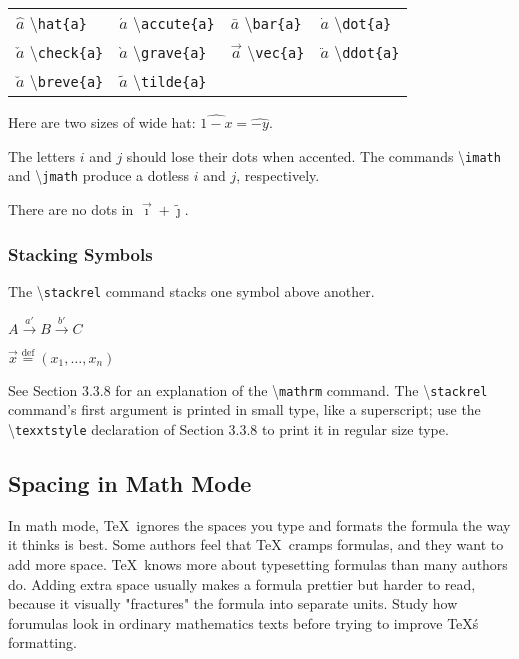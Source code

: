 \documentclass[twocolumn]{book}        %
\begin{document}
\begin{tabular}{l l l l}
        $\hat{a}$ \textbackslash \texttt{hat\{a\}}          &   
        $\acute{a}$ \textbackslash \texttt{accute\{a\}}     &
        $\bar{a}$ \textbackslash \texttt{bar\{a\}}          &
        $\dot{a}$ \textbackslash \texttt{dot\{a\}}          \\

        $\check{a}$ \textbackslash \texttt{check\{a\}}      &   
        $\grave{a}$ \textbackslash \texttt{grave\{a\}}      &
        $\vec{a}$ \textbackslash \texttt{vec\{a\}}          &
        $\ddot{a}$ \textbackslash \texttt{ddot\{a\}}        \\


        $\breve{a}$ \textbackslash \texttt{breve\{a\}}      &   
        $\tilde{a}$ \textbackslash \texttt{tilde\{a\}}        \\
\end{tabular}

Here are two sizes of wide hat: \( \widehat{1-x} = \widehat{-y} \).


The letters $i$ and $j$ should lose their dots when accented. The commands \textbackslash \texttt{imath}
and \textbackslash \texttt{jmath} produce a dotless $i$ and $j$, respectively.

There are no dots in \( \vec{\imath} + \tilde{\jmath} \).

\subsubsection{Stacking Symbols}

The \textbackslash \texttt{stackrel} command stacks one symbol above another.

\( A \stackrel{a'}{\rightarrow} B \stackrel{b'}{\rightarrow} C \)

\( \vec{x} \stackrel{\mathrm{def}}{=} (x_{1}, \ldots, x_{n}) \)

\noindent
See Section 3.3.8 for an explanation of the \textbackslash \texttt{mathrm} command. 
The \textbackslash \texttt{stackrel} command's first argument is printed in small type, like a superscript;
use the \textbackslash \texttt{texxtstyle} declaration of Section 3.3.8 to print it in regular size type.

\subsection{Spacing in Math Mode}

In math mode, \TeX\ ignores the spaces you type and formats the formula the way it thinks is best.
Some authors feel that \TeX\ cramps formulas, and they want to add more space. \TeX\ knows more 
about typesetting formulas than many authors do. Adding extra space usually makes a formula prettier
but harder to read, because it visually "fractures" the formula into separate units. Study how 
forumulas look in ordinary mathematics texts before trying to improve \TeX\'s formatting.
\end{document}
